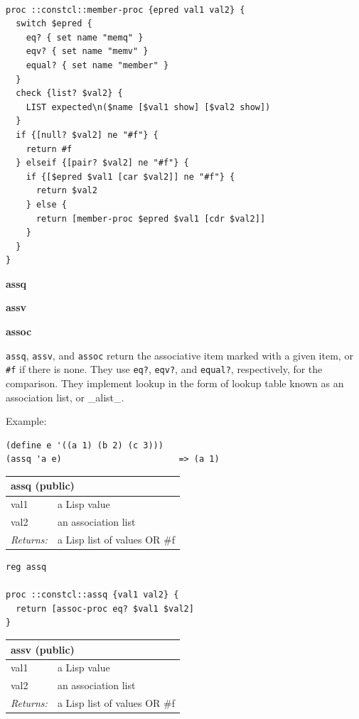 \documentclass[twoside,9pt]{report}
\begin{document}
\noindent\makebox[\linewidth]{\rule{\linewidth}{0.4pt}}
\begin{lstlisting}
 
proc ::constcl::member-proc {epred val1 val2} {
  switch $epred {
    eq? { set name "memq" }
    eqv? { set name "memv" }
    equal? { set name "member" }
  }
  check {list? $val2} {
    LIST expected\n($name [$val1 show] [$val2 show])
  }
  if {[null? $val2] ne "#f"} {
    return #f
  } elseif {[pair? $val2] ne "#f"} {
    if {[$epred $val1 [car $val2]] ne "#f"} {
      return $val2
    } else {
      return [member-proc $epred $val1 [cdr $val2]]
    }
  }
}
\end{lstlisting}
\noindent\makebox[\linewidth]{\rule{\linewidth}{0.4pt}}

\textbf{assq}


\textbf{assv}


\textbf{assoc}


\texttt{assq}, \texttt{assv}, and \texttt{assoc} return the associative item marked with a given item, or \texttt{\#f} if there is none. They use \texttt{eq?}, \texttt{eqv?}, and \texttt{equal?}, respectively, for the comparison. They implement lookup in the form of lookup table known as an association list, or \_alist\_.


Example:

\noindent\makebox[\linewidth]{\rule{\linewidth}{0.4pt}}
\begin{lstlisting}
(define e '((a 1) (b 2) (c 3)))
(assq 'a e)                       => (a 1)
\end{lstlisting}
\noindent\makebox[\linewidth]{\rule{\linewidth}{0.4pt}}
\begin{tabular}{ |l l| }
\hline
\multicolumn{2}{|l|}{assq (public)} \\
\hline
val1 & a Lisp value \\
val2 & an association list \\
\textit{Returns:} & a Lisp list of values OR \#f \\
\hline
\end{tabular}

\noindent\makebox[\linewidth]{\rule{\linewidth}{0.4pt}}
\begin{lstlisting}
reg assq
 
proc ::constcl::assq {val1 val2} {
  return [assoc-proc eq? $val1 $val2]
}
\end{lstlisting}
\noindent\makebox[\linewidth]{\rule{\linewidth}{0.4pt}}
\begin{tabular}{ |l l| }
\hline
\multicolumn{2}{|l|}{assv (public)} \\
\hline
val1 & a Lisp value \\
val2 & an association list \\
\textit{Returns:} & a Lisp list of values OR \#f \\
\hline
\end{tabular}
\end{document}
